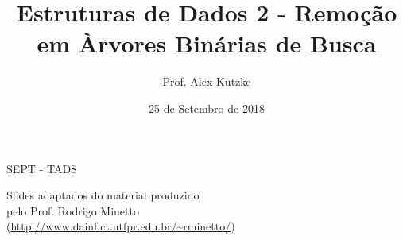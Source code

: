 \documentclass{beamer}
\title{Estruturas de Dados 2 - Remoção em \`{A}rvores Binárias de Busca}
\author{Prof. Alex Kutzke}
\date{25 de Setembro de 2018}
\begin{document}
	\begin{frame}
		\begin{center}
			\large{SEPT - TADS}
		\end{center}
		\titlepage
		\begin{center}
			Slides adaptados do material produzido\\pelo Prof. Rodrigo Minetto\\(\url{http://www.dainf.ct.utfpr.edu.br/~rminetto/})
		\end{center}
	\end{frame}
	
\end{document}
